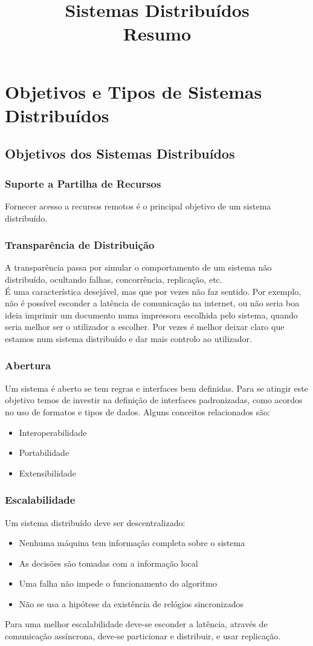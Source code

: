 \documentclass[10pt,a4paper]{report}
\title{\LARGE{Sistemas Distribuídos} \\ \vspace{0.5cm} \normalsize{Resumo}}
\date{}
\begin{document}
\maketitle
\tableofcontents

\chapter{Objetivos e Tipos de Sistemas Distribuídos}
\section{Objetivos dos Sistemas Distribuídos}
\subsection{Suporte a Partilha de Recursos}
Fornecer acesso a recursos remotos é o principal objetivo de um sistema distribuído.
\subsection{Transparência de Distribuição}
A transparência passa por simular o comportamento de um sistema não distribuído, ocultando falhas, concorrência, replicação, etc. \\
É uma característica desejável, mas que por vezes não faz sentido. Por exemplo, não é possível esconder a latência de comunicação na internet, ou não seria boa ideia imprimir um documento numa impressora escolhida pelo sistema, quando seria melhor ser o utilizador a escolher. Por vezes é melhor deixar claro que estamos num sistema distribuído e dar mais controlo ao utilizador.
\subsection{Abertura}
Um sistema é aberto se tem regras e interfaces bem definidas. Para se atingir este objetivo temos de investir na definição de interfaces padronizadas, como acordos no uso de formatos e tipos de dados. Alguns conceitos relacionados são:
\begin{itemize}
\item Interoperabilidade
\item Portabilidade
\item Extensibilidade
\end{itemize}
\subsection{Escalabilidade}
Um sistema distribuído deve ser descentralizado:
\begin{itemize}
\item Nenhuma máquina tem informação completa sobre o sistema
\item As decisões são tomadas com a informação local
\item Uma falha não impede o funcionamento do algoritmo
\item Não se usa a hipótese da existência de relógios sincronizados
\end{itemize}
Para uma melhor escalabilidade deve-se esconder a latência, através de comunicação assíncrona, deve-se particionar e distribuir, e usar replicação.
\end{document}
